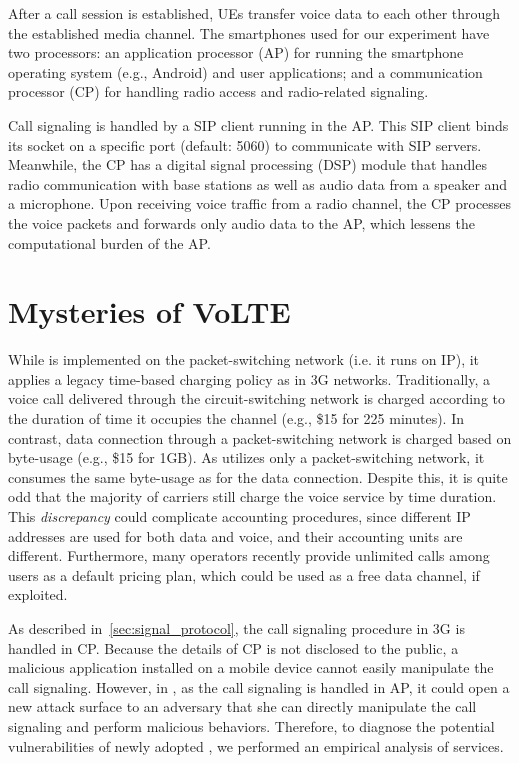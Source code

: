   After a call session is
established, UEs transfer voice data to each other through the
established media channel. The smartphones used for our experiment have
two processors: an application processor (AP) for running the smartphone
operating system (e.g., Android) and user applications; and a
communication processor (CP) for handling radio access and
radio-related signaling.

Call signaling is handled by a SIP client running in the AP. This SIP client
binds its socket on a specific port (default: 5060) to communicate with SIP
servers. Meanwhile, the CP has a digital signal processing (DSP) module that
handles radio communication with base stations as well as audio data from a
speaker and a microphone. Upon receiving voice traffic from a radio
channel, the CP processes the voice packets and forwards only audio data to
the AP, which lessens the computational burden of the AP. 

\section{Mysteries of VoLTE}
While \vt is implemented on the packet-switching network (i.e. it runs on IP), it
applies a legacy time-based charging policy as in 3G networks.
Traditionally, a voice call delivered through the circuit-switching network is charged according to
the duration of time it occupies the channel (e.g., \$15 for 225
minutes).  In contrast, data connection through a packet-switching network is
charged based on byte-usage (e.g., \$15 for 1GB). As \vt utilizes
only a packet-switching network, it consumes the same byte-usage as for the data
connection. Despite this, it is quite odd that the majority of
carriers still charge the voice service by time duration. This {\it
  discrepancy} could complicate accounting procedures, since different
IP addresses are used for both data and voice, and their accounting
units are different. Furthermore, many operators recently provide
unlimited calls among \vt users as a default pricing plan, which could
be used as a free data channel, if exploited.

As described in~\autoref{sec:signal_protocol}, the call signaling procedure
in 3G is handled in CP. Because the details of CP is not disclosed to the
public, a malicious application installed on a mobile device cannot easily
manipulate the call signaling. However, in \vt, as the call signaling is handled
in AP, it could open a new attack surface to an adversary that she can directly
manipulate the call signaling and perform malicious behaviors. Therefore, to
diagnose the potential vulnerabilities of newly adopted \vt, we performed
an empirical analysis of \vt services.



